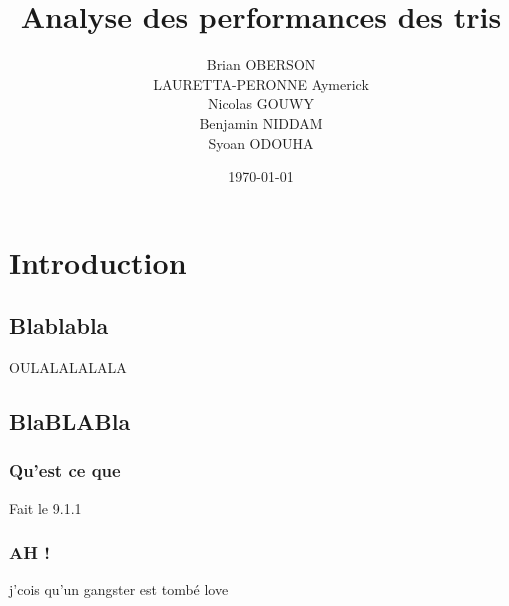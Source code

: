 \documentclass[a4paper, 11pt, french]{report}
\begin{document}
\title{Analyse des performances des tris}
    
    \author{Brian OBERSON\\
    LAURETTA-PERONNE Aymerick\\
    Nicolas GOUWY\\
    Benjamin NIDDAM\\
    Syoan ODOUHA\\
    }
    \date{\today}

\maketitle



    \dominitoc
    \tableofcontents
    \chapter{Introduction}
    \minitoc
    \section{Blablabla}
    OULALALALALA 
    \section{BlaBLABla}
        \subsection{Qu'est ce que}
        Fait le 9.1.1
        \subsection{AH ! }
        j'cois qu'un gangster est tombé love
          
\end{document}
